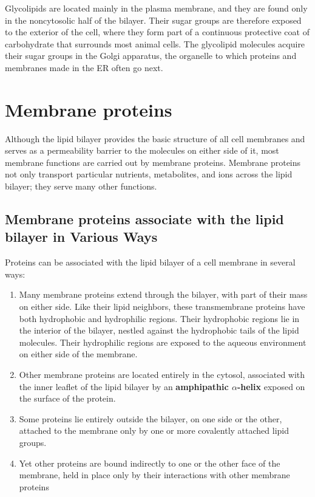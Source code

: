 Glycolipids are located mainly in the plasma membrane, and they are
found only in the noncytosolic half of the bilayer. Their sugar groups are
therefore exposed to the exterior of the cell, where they
form part of a continuous protective coat of carbohydrate that surrounds
most animal cells. The glycolipid molecules acquire their sugar groups
in the Golgi apparatus, the organelle to which proteins and membranes
made in the ER often go next.

\section{Membrane proteins}

Although the lipid bilayer provides the basic structure of all cell membranes
and serves as a permeability barrier to the molecules on either
side of it, most membrane functions are carried out by membrane proteins.
Membrane proteins not only transport particular nutrients, metabolites,
and ions across the lipid bilayer; they serve many other functions.

\subsection{Membrane proteins associate with the lipid bilayer in Various Ways}

Proteins can be associated with the lipid bilayer of a cell membrane in
several ways:

\begin{enumerate}
\item Many membrane proteins extend through the bilayer, with part of
their mass on either side. Like their lipid neighbors,
these transmembrane proteins have both hydrophobic and
hydrophilic regions. Their hydrophobic regions lie in the interior
of the bilayer, nestled against the hydrophobic tails of the lipid
molecules. Their hydrophilic regions are exposed to the aqueous
environment on either side of the membrane.
\item Other membrane proteins are located entirely in the cytosol, associated
with the inner leaflet of the lipid bilayer by an \textbf{amphipathic $\alpha$-helix} exposed on the surface of the protein.
\item Some proteins lie entirely outside the bilayer, on one side or the
other, attached to the membrane only by one or more covalently
attached lipid groups.
\item Yet other proteins are bound indirectly to one or the other face of
the membrane, held in place only by their interactions with other
membrane proteins
\end{enumerate}

